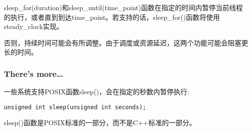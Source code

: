 sleep\_for(duration)和sleep\_until(time\_point)函数在指定的时间内暂停当前线程的执行，或者直到到达time\_point。若支持的话，sleep\_for()函数将使用steady\_clock实现。

否则，持续时间可能会有所调整。由于调度或资源延迟，这两个功能可能会阻塞更长的时间。

\subsubsection{There's more…}

一些系统支持POSIX函数sleep()，会在指定的秒数内暂停执行:

\begin{lstlisting}[style=styleCXX]
unsigned int sleep(unsigned int seconds);
\end{lstlisting}

sleep()函数是POSIX标准的一部分，而不是C++标准的一部分。







